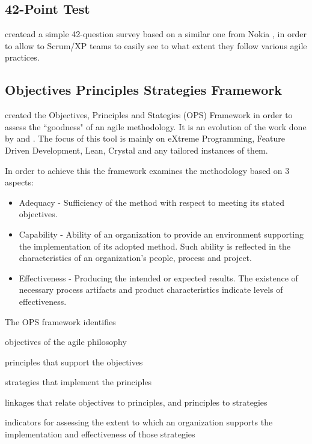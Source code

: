 \subsection{42-Point Test}
\citet{42points} createad a simple 42-question survey based on a similar one from Nokia \cite{nokia}, in order to allow to Scrum/XP teams to easily see to what extent they follow various agile practices.

\subsection{Objectives Principles Strategies Framework}
\label{subsec:ops}
\citet{sventha_dissertation} created the Objectives, Principles and Stategies (OPS) Framework in order to assess the ``goodness" of an agile methodology. It is an evolution of the work done by \citet{2604} and \citet{sidky_dissertation}. The focus of this tool is mainly on eXtreme Programming, Feature Driven Development, Lean, Crystal and any tailored instances of them.

In order to achieve this the framework examines the methodology based on 3 aspects:
\begin{itemize}
\item Adequacy - Sufficiency of the method with respect to meeting its stated objectives.
\item Capability - Ability of an organization to provide an environment supporting the implementation of its adopted method. Such ability is reflected in the characteristics of an organization's people, process
and project.
\item Effectiveness - Producing the intended or expected results. The existence of necessary process artifacts and product characteristics indicate levels of effectiveness.
\end{itemize}


The OPS framework identifies 
\begin{inparaenum} [a\upshape)]
\item objectives of the agile philosophy
\item principles that support the objectives
\item strategies that implement the principles
\item linkages that relate objectives to
principles, and principles to strategies
\item indicators for assessing the extent to which an organization supports the implementation and effectiveness of those strategies
\end{inparaenum}

